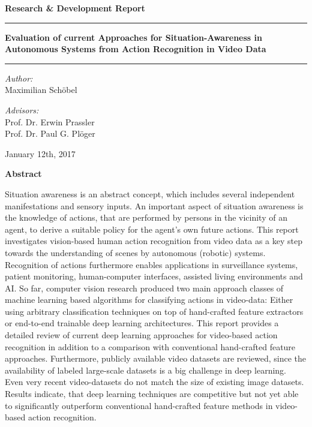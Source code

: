 \documentclass[a4paper, 11pt, listof=totoc, bibliography=totoc]{scrartcl}
\begin{document}
\thispagestyle{empty}
\begin{center}
\large
\textbf{Research \& Development Report} \\
\LARGE

\vspace{1cm}

\vspace{-0.75\baselineskip}\rule{\linewidth}{1.5pt}
\textbf{Evaluation of current Approaches for Situation-Awareness in Autonomous Systems from Action Recognition in Video Data} \\
\vspace{-0.25\baselineskip}\rule{\linewidth}{1.5pt}

\vspace{1cm}

\normalsize
\textit{Author:}\\
Maximilian Schöbel
\bigskip

\textit{Advisors:}\\
Prof. Dr. Erwin Prassler\\
Prof. Dr. Paul G. Plöger\\
\bigskip

January 12th, 2017

\vfill

\textbf{Abstract}
\end{center}
\small
Situation awareness is an abstract concept, which includes several independent manifestations and sensory inputs.
An important aspect of situation awareness is the knowledge of actions, that are performed by persons in the vicinity of an agent, to derive a suitable policy for the agent's own future actions.
This report investigates vision-based human action recognition from video data as a key step towards the understanding of scenes by autonomous (robotic) systems.
Recognition of actions furthermore enables applications in surveillance systems, patient monitoring, human-computer interfaces, assisted living environments and AI.
So far, computer vision research produced two main approach classes of machine learning based algorithms for classifying actions in video-data:
Either using arbitrary classification techniques on top of hand-crafted feature extractors or end-to-end trainable deep learning architectures.
This report provides a detailed review of current deep learning approaches for video-based action recognition in addition to a comparison with conventional hand-crafted feature approaches.
Furthermore, publicly available video datasets are reviewed, since the availability of labeled large-scale datasets is a big challenge in deep learning.
Even very recent video-datasets do not match the size of existing image datasets.
Results indicate, that deep learning techniques are competitive but not yet able to significantly outperform conventional hand-crafted feature methods in video-based action recognition.
\end{document}
